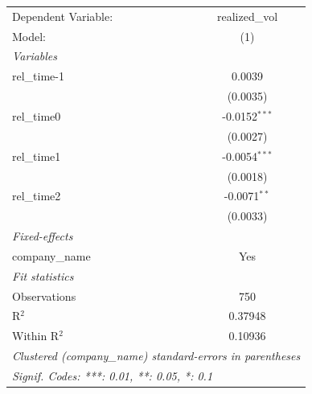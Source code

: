
\begingroup
\centering
\begin{tabular}{lc}
   \tabularnewline \midrule \midrule
   Dependent Variable: & realized\_vol\\   
   Model:              & (1)\\  
   \midrule
   \emph{Variables}\\
   rel\_time-1         & 0.0039\\   
                       & (0.0035)\\   
   rel\_time0          & -0.0152$^{***}$\\   
                       & (0.0027)\\   
   rel\_time1          & -0.0054$^{***}$\\   
                       & (0.0018)\\   
   rel\_time2          & -0.0071$^{**}$\\   
                       & (0.0033)\\   
   \midrule
   \emph{Fixed-effects}\\
   company\_name       & Yes\\  
   \midrule
   \emph{Fit statistics}\\
   Observations        & 750\\  
   R$^2$               & 0.37948\\  
   Within R$^2$        & 0.10936\\  
   \midrule \midrule
   \multicolumn{2}{l}{\emph{Clustered (company\_name) standard-errors in parentheses}}\\
   \multicolumn{2}{l}{\emph{Signif. Codes: ***: 0.01, **: 0.05, *: 0.1}}\\
\end{tabular}
\par\endgroup


